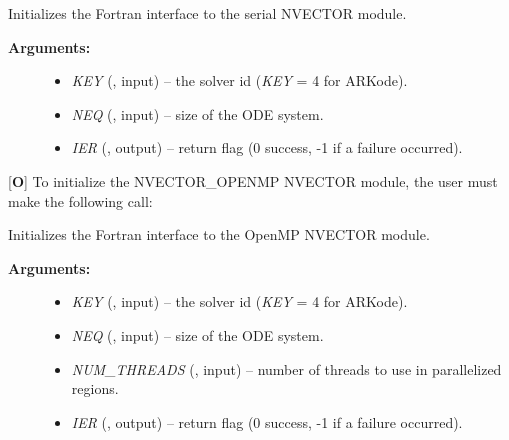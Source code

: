 \documentclass[letterpaper,10pt,english]{sphinxmanual}
\begin{document}
\begin{fulllineitems}
\label{f_interface/Usage:f/_/FNVINITS}
Initializes the Fortran interface to the serial NVECTOR module.
\begin{description}
\item[{\textbf{Arguments:}}] \leavevmode\begin{itemize}
\item {} 
\emph{KEY} (, input) -- the solver id (\emph{KEY} = 4 for ARKode).

\item {} 
\emph{NEQ} (, input) -- size of the ODE system.

\item {} 
\emph{IER} (, output) -- return flag (0 success, -1 if a
failure occurred).

\end{itemize}

\end{description}

\end{fulllineitems}


{[}\textbf{O}{]} To initialize the NVECTOR\_OPENMP NVECTOR module, the user must
make the following call:

\begin{fulllineitems}
\label{f_interface/Usage:f/_/FNVINITOMP}
Initializes the Fortran interface to the OpenMP NVECTOR module.
\begin{description}
\item[{\textbf{Arguments:}}] \leavevmode\begin{itemize}
\item {} 
\emph{KEY} (, input) -- the solver id (\emph{KEY} = 4 for ARKode).

\item {} 
\emph{NEQ} (, input) -- size of the ODE system.

\item {} 
\emph{NUM\_THREADS} (, input) -- number of threads to use in
parallelized regions.

\item {} 
\emph{IER} (, output) -- return flag (0 success, -1 if a
failure occurred).

\end{itemize}

\end{description}

\end{fulllineitems}
\end{document}
